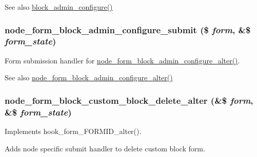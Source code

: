 \begin{DoxySeeAlso}{See also}
\hyperlink{group__forms_ga0efaf6e043d69e3fe4f596341f6f90e2}{block\_\-admin\_\-configure()} 
\end{DoxySeeAlso}
\hypertarget{node_8module_ad665eaeb7a14a6cea1385cf3293241b8}{
\subsubsection[{node\_\-form\_\-block\_\-admin\_\-configure\_\-submit}]{\setlength{\rightskip}{0pt plus 5cm}node\_\-form\_\-block\_\-admin\_\-configure\_\-submit (\$ {\em form}, \/  \&\$ {\em form\_\-state})}}
\label{node_8module_ad665eaeb7a14a6cea1385cf3293241b8}
Form submission handler for \hyperlink{node_8module_aa7774912602cb998d0ab075802165345}{node\_\-form\_\-block\_\-admin\_\-configure\_\-alter()}.

\begin{DoxySeeAlso}{See also}
\hyperlink{node_8module_aa7774912602cb998d0ab075802165345}{node\_\-form\_\-block\_\-admin\_\-configure\_\-alter()} 
\end{DoxySeeAlso}
\hypertarget{node_8module_adeb6930eb48582c58ccf8ae089e70cfc}{
\subsubsection[{node\_\-form\_\-block\_\-custom\_\-block\_\-delete\_\-alter}]{\setlength{\rightskip}{0pt plus 5cm}node\_\-form\_\-block\_\-custom\_\-block\_\-delete\_\-alter (\&\$ {\em form}, \/  \&\$ {\em form\_\-state})}}
\label{node_8module_adeb6930eb48582c58ccf8ae089e70cfc}
Implements hook\_\-form\_\-FORMID\_\-alter().

Adds node specific submit handler to delete custom block form.

